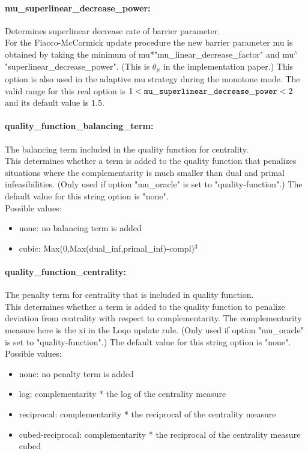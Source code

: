 \paragraph{mu\_superlinear\_decrease\_power:}\label{sec:mu_superlinear_decrease_power} Determines superlinear decrease rate of barrier parameter. $\;$ \\
 For the Fiacco-McCormick update procedure the new
barrier parameter mu is obtained by taking the
minimum of mu*"mu\_linear\_decrease\_factor" and
mu$^\wedge$"superlinear\_decrease\_power".  (This is
$\theta_\mu$ in the implementation paper.) This option
is also used in the adaptive mu strategy during
the monotone mode. The valid range for this real option is 
$1 <  {\tt mu\_superlinear\_decrease\_power } <  2$
and its default value is $1.5$.


\paragraph{quality\_function\_balancing\_term:}\label{sec:quality_function_balancing_term} The balancing term included in the quality function for centrality. $\;$ \\
 This determines whether a term is added to the
quality function that penalizes situations where
the complementarity is much smaller than dual and
primal infeasibilities. (Only used if option
"mu\_oracle" is set to "quality-function".)
The default value for this string option is "none".
\\ 
Possible values:
\begin{itemize}
   \item none: no balancing term is added
   \item cubic: Max(0,Max(dual\_inf,primal\_inf)-compl)$^3$
\end{itemize}

\paragraph{quality\_function\_centrality:}\label{sec:quality_function_centrality} The penalty term for centrality that is included in quality function. $\;$ \\
 This determines whether a term is added to the
quality function to penalize deviation from
centrality with respect to complementarity.  The
complementarity measure here is the xi in the
Loqo update rule. (Only used if option
"mu\_oracle" is set to "quality-function".)
The default value for this string option is "none".
\\ 
Possible values:
\begin{itemize}
   \item none: no penalty term is added
   \item log: complementarity * the log of the centrality
measure
   \item reciprocal: complementarity * the reciprocal of the
centrality measure
   \item cubed-reciprocal: complementarity * the reciprocal of the
centrality measure cubed
\end{itemize}

